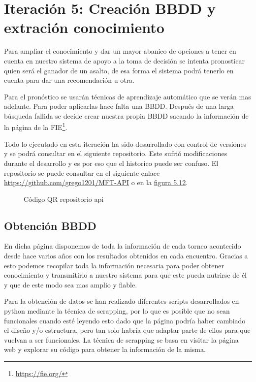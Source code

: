 \section{Iteración 5: Creación \acs{BBDD} y extración conocimiento}

Para ampliar el conocimiento y dar un mayor abanico de opciones
a tener en cuenta en nuestro sistema de apoyo a la toma de decisión
se intenta pronosticar quien será el ganador de un asalto, de esa forma
el sistema podrá tenerlo en cuenta para dar una recomendación u otra.


Para el pronóstico se usarán técnicas de aprendizaje automático que se
verán mas adelante. Para poder aplicarlas hace falta una \acs{BBDD}. Después de
una larga búsqueda fallida se decide crear nuestra propia \acs{BBDD} sacando
la información de la página de la \acl{FIE}\footnote{\url{https://fie.org/}}.

Todo lo ejecutado en esta iteración ha sido desarrollado con control de versiones
y se podrá consultar en el siguiente repositorio. Este sufrió modificaciones durante
el desarrollo y es por eso que el historico puede ser confuso. El repositorio se puede
consultar en el siguiente enlace \url{https://github.com/grego1201/MFT-API} o en la \hyperref[fig:Código QR repositorio api]{figura 5.12}.

\begin{figure}[htb]
  \centering
  \caption[Código QR repositorio api]{Código QR repositorio api}
  \label{fig:Código QR repositorio api}
\end{figure}

\subsection{Obtención \acs{BBDD}}

En dicha página disponemos de toda la información de cada torneo acontecido
desde hace varios años con los resultados obtenidos en cada encuentro. Gracias
a esto podemos recopilar toda la información necesaria para poder obtener conocimiento
y transmitirlo a nuestro sistema para que este pueda nutrirse de él y que de este
modo sea mas amplio y fiable.

Para la obtención de datos se han realizado diferentes scripts desarrollados en
python mediante la técnica de scrapping, por lo que es posible que no sean funcionales
cuando esté leyendo esto dado que la página podría haber cambiado el diseño y/o
estructura, pero tan solo habría que adaptar parte de ellos para que vuelvan a
ser funcionales. La técnica de scrapping se basa en visitar la página web y
explorar su código para obtener la información de la misma.


